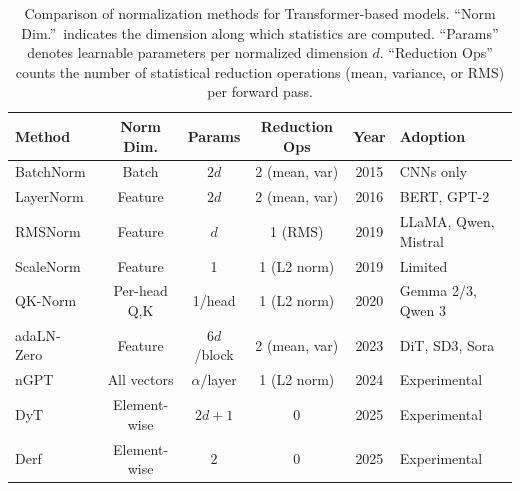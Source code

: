 \begin{table}[t]
\centering
\caption{Comparison of normalization methods for Transformer-based models. ``Norm Dim.''\ indicates the dimension along which statistics are computed. ``Params'' denotes learnable parameters per normalized dimension $d$. ``Reduction Ops'' counts the number of statistical reduction operations (mean, variance, or RMS) per forward pass.}
\label{tab:norm_comparison}
\small
\begin{tabular}{lccccl}
\toprule
\textbf{Method} & \textbf{Norm Dim.} & \textbf{Params} & \textbf{Reduction Ops} & \textbf{Year} & \textbf{Adoption} \\
\midrule
BatchNorm~\cite{ioffe2015batch} & Batch & $2d$ & 2 (mean, var) & 2015 & CNNs only \\
LayerNorm~\cite{ba2016layer} & Feature & $2d$ & 2 (mean, var) & 2016 & BERT, GPT-2 \\
RMSNorm~\cite{zhang2019root} & Feature & $d$ & 1 (RMS) & 2019 & LLaMA, Qwen, Mistral \\
ScaleNorm~\cite{nguyen2019transformers} & Feature & 1 & 1 (L2 norm) & 2019 & Limited \\
QK-Norm~\cite{henry2020query} & Per-head Q,K & 1/head & 1 (L2 norm) & 2020 & Gemma 2/3, Qwen 3 \\
adaLN-Zero~\cite{peebles2023scalable} & Feature & $6d$/block & 2 (mean, var) & 2023 & DiT, SD3, Sora \\
nGPT~\cite{loshchilov2024ngpt} & All vectors & $\alpha$/layer & 1 (L2 norm) & 2024 & Experimental \\
DyT~\cite{zhu2025transformers} & Element-wise & $2d{+}1$ & 0 & 2025 & Experimental \\
Derf~\cite{chen2025stronger} & Element-wise & 2 & 0 & 2025 & Experimental \\
\bottomrule
\end{tabular}
\end{table}
